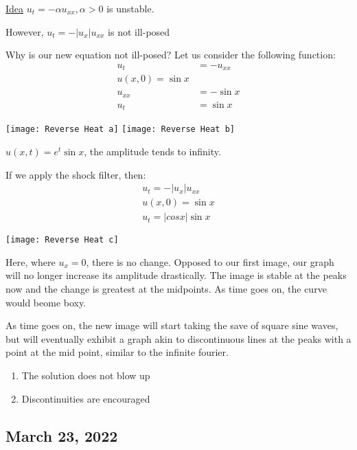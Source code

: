 \documentclass{article}
\begin{document}
\underline{Idea} $u_t = -\alpha u_{xx}, \alpha > 0$ is unstable.

However, $u_t = -|u_x| u_{xx}$ is not ill-posed

Why is our new equation not ill-posed? Let us consider the following function:
%
\begin{align*}
  u_t & = -u_{xx}\\
  u(x, 0) = \sin x\\
  u_{xx} & = -\sin x\\
  u_t & = \sin x
\end{align*}

\begin{center}
  \texttt{[image: Reverse Heat a]}
  \texttt{[image: Reverse Heat b]}
\end{center}

$u(x, t) = e^t \sin x$, the amplitude tends to infinity.

If we apply the shock filter, then:
%
\begin{align*}
  u_t = -|u_x| u_{xx}\\
  u(x, 0) = \sin x\\
  u_t = |cos x| \sin x
\end{align*}

\begin{center}
  \texttt{[image: Reverse Heat c]}
\end{center}

Here, where $u_x = 0$, there is no change. Opposed to our first image, our graph will no longer increase its amplitude drastically. The image is stable at the peaks now and the change is greatest at the midpoints. As time goes on, the curve would beome boxy.

As time goes on, the new image will start taking the save of square sine waves, but will eventually exhibit a graph akin to discontinuous lines at the peaks with a point at the mid point, similar to the infinite fourier.

\note
\begin{enumerate}
  \item The solution does not blow up
  \item Discontinuities are encouraged
\end{enumerate}

\subsection*{March 23, 2022}
\end{document}
